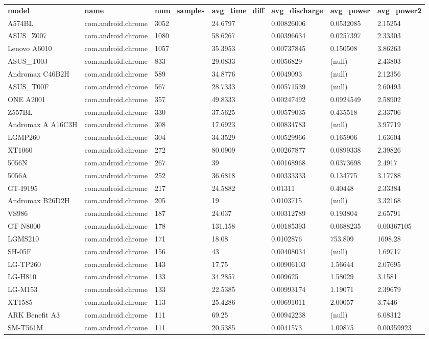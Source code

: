 \documentclass[
]{article}
\author{}
\date{}
\begin{document}
\begin{longtable}[]{@{}lllllll@{}}
\toprule
\endhead
\textbf{model} & \textbf{name} & \textbf{num\_samples} &
\textbf{avg\_time\_diff} & \textbf{avg\_discharge} & \textbf{avg\_power}
& \textbf{avg\_power2}\tabularnewline
A574BL & com.android.chrome & 3052 & 24.6797 & 0.00826006 & 0.0532085 &
2.15254\tabularnewline
ASUS\_Z007 & com.android.chrome & 1080 & 58.6267 & 0.00396634 &
0.0257397 & 2.33303\tabularnewline
Lenovo A6010 & com.android.chrome & 1057 & 35.3953 & 0.00737845 &
0.150508 & 3.86263\tabularnewline
ASUS\_T00J & com.android.chrome & 833 & 29.0833 & 0.0056829 & (null) &
2.43803\tabularnewline
Andromax C46B2H & com.android.chrome & 589 & 34.8776 & 0.0049093 &
(null) & 2.12356\tabularnewline
ASUS\_T00F & com.android.chrome & 567 & 28.7333 & 0.00571539 & (null) &
2.60493\tabularnewline
ONE A2001 & com.android.chrome & 357 & 49.8333 & 0.00247492 & 0.0924549
& 2.58902\tabularnewline
Z557BL & com.android.chrome & 330 & 37.5625 & 0.00579035 & 0.435518 &
2.33706\tabularnewline
Andromax A A16C3H & com.android.chrome & 308 & 17.6923 & 0.00834783 &
(null) & 3.97719\tabularnewline
LGMP260 & com.android.chrome & 304 & 34.3529 & 0.00529966 & 0.165906 &
1.63604\tabularnewline
XT1060 & com.android.chrome & 272 & 80.0909 & 0.00267877 & 0.0899338 &
2.39826\tabularnewline
5056N & com.android.chrome & 267 & 39 & 0.00168968 & 0.0373698 &
2.4917\tabularnewline
5056A & com.android.chrome & 252 & 36.6818 & 0.00333333 & 0.134775 &
3.17788\tabularnewline
GT-I9195 & com.android.chrome & 217 & 24.5882 & 0.01311 & 0.40448 &
2.33384\tabularnewline
Andromax B26D2H & com.android.chrome & 205 & 19 & 0.0103715 & (null) &
3.32168\tabularnewline
VS986 & com.android.chrome & 187 & 24.037 & 0.00312789 & 0.193804 &
2.65791\tabularnewline
GT-N8000 & com.android.chrome & 178 & 131.158 & 0.00185393 & 0.0688235 &
0.00367105\tabularnewline
LGMS210 & com.android.chrome & 171 & 18.08 & 0.0102876 & 753.809 &
1698.28\tabularnewline
SH-05F & com.android.chrome & 156 & 43 & 0.00408034 & (null) &
1.69717\tabularnewline
LG-TP260 & com.android.chrome & 143 & 17.75 & 0.00906103 & 1.56644 &
2.07695\tabularnewline
LG-H810 & com.android.chrome & 133 & 34.2857 & 0.009625 & 1.58029 &
3.1581\tabularnewline
LG-M153 & com.android.chrome & 133 & 22.5385 & 0.00993174 & 1.19071 &
2.39679\tabularnewline
XT1585 & com.android.chrome & 113 & 25.4286 & 0.00691011 & 2.00057 &
3.7446\tabularnewline
ARK Benefit A3 & com.android.chrome & 111 & 69.25 & 0.00942238 & (null)
& 6.08312\tabularnewline
SM-T561M & com.android.chrome & 111 & 20.5385 & 0.0041573 & 1.00875 &
0.00359923\tabularnewline

\end{longtable}
\end{document}

